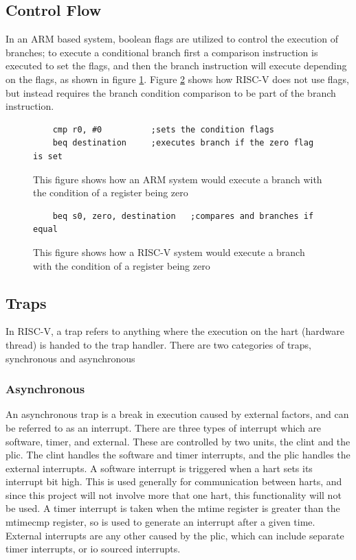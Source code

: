 \subsection{Control Flow}
In an ARM based system, boolean flags are utilized to control the execution of branches; to execute a conditional branch first a comparison instruction is executed to set the flags, and then the branch instruction will execute depending on the flags, as shown in figure \ref{fig:arm_branch}. Figure \ref{fig:riscv_branch} shows how RISC-V does not use flags, but instead requires the branch condition comparison to be part of the branch instruction.
\begin{figure}[H]
\begin{verbatim}
    cmp r0, #0          ;sets the condition flags
    beq destination     ;executes branch if the zero flag is set
\end{verbatim}
\caption[ARM branching code]{This figure shows how an ARM system would execute a branch with the condition of a register being zero}
\label{fig:arm_branch}
\end{figure}
\begin{figure}[H]
\begin{verbatim}
    beq s0, zero, destination   ;compares and branches if equal
\end{verbatim}
\caption[RISC-V branching code]{This figure shows how a RISC-V system would execute a branch with the condition of a register being zero}
\label{fig:riscv_branch}
\end{figure}
\subsection{Traps}
In RISC-V, a trap refers to anything where the execution on the hart (hardware thread) is handed to the trap handler. There are two categories of traps, synchronous and asynchronous
\subsubsection{Asynchronous}
An asynchronous trap is a break in execution caused by external factors, and can be referred to as an interrupt. There are three types of interrupt which are software, timer, and external. These are controlled by two units, the \ac{clint} and the \ac{plic}. The \ac{clint} handles the software and timer interrupts, and the \ac{plic} handles the external interrupts. A software interrupt is triggered when a hart sets its interrupt bit high. This is used generally for communication between harts, and since this project will not involve more that one hart, this functionality will not be used. A timer interrupt is taken when the mtime register is greater than the mtimecmp register, so is used to generate an interrupt after a given time. External interrupts are any other caused by the \ac{plic}, which can include separate timer interrupts, or \ac{io} sourced interrupts\cite{sifive_manual}.
